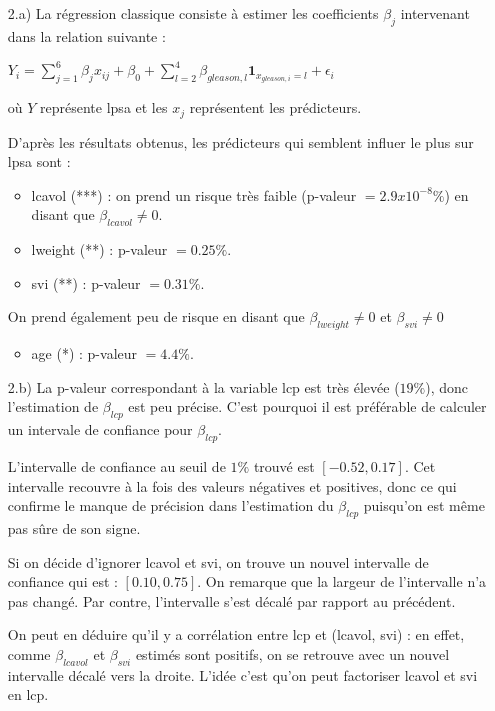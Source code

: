 \documentclass[a4paper, 12pt]{article}
\begin{document}
\begin{enumerate}
\setlength{\itemsep}{20pt}
\item[2.a)]
La régression classique consiste à estimer les coefficients $\beta_{j}$ intervenant dans la relation suivante :

$ Y_{i} = \sum\limits_{j=1}^6 \beta_{j} x_{ij} + \beta_{0} + \sum\limits_{l=2}^4 \beta_{gleason, l} \mathbf{1}_{x_{gleason, i}=l} + \epsilon_{i} $

où $Y$ représente lpsa et les $x_{j}$ représentent les prédicteurs.  

D'après les résultats obtenus, les prédicteurs qui semblent influer le plus sur lpsa sont :
\begin{itemize}
\item lcavol (***) : on prend un risque très faible (p-valeur $=2.9x10^{-8}\%$) en disant que $\beta_{lcavol} \neq 0$.
\item lweight (**) : p-valeur $=0.25\%$.
\item svi (**) : p-valeur $=0.31\%$.
\end{itemize}
On prend également peu de risque en disant que $\beta_{lweight} \neq 0$ et $\beta_{svi} \neq 0$ 
\begin{itemize}
\item age (*) : p-valeur $=4.4\%$.
\end{itemize}


\item[2.b)] La p-valeur correspondant à la variable lcp est très élevée ($19\%$), donc l'estimation de $\beta_{lcp}$ est peu précise. C'est pourquoi il est préférable de calculer un intervale de confiance pour $\beta_{lcp}$.

L'intervalle de confiance au seuil de $1\%$ trouvé est $[-0.52, 0.17]$. Cet intervalle recouvre à la fois des valeurs négatives et positives, donc ce qui confirme le manque de précision dans l'estimation du $\beta_{lcp}$ puisqu'on est même pas sûre de son signe.

Si on décide d'ignorer lcavol et svi, on trouve un nouvel intervalle de confiance qui est : $[0.10, 0.75]$. On remarque que la largeur de l'intervalle n'a pas changé. Par contre, l'intervalle s'est décalé par rapport au précédent. 

On peut en déduire qu'il y a corrélation entre lcp et (lcavol, svi) : en effet, comme $\beta_{lcavol}$ et $\beta_{svi}$ estimés sont positifs, on se retrouve avec un nouvel intervalle décalé vers la droite. L'idée c'est qu'on peut factoriser lcavol et svi en lcp.


\end{enumerate}
\end{document}

